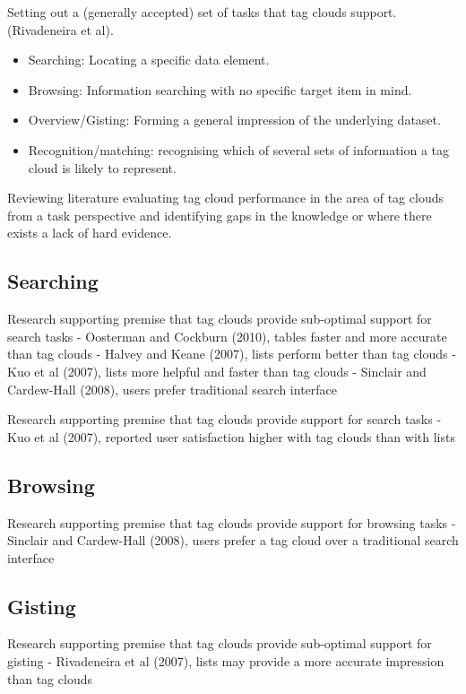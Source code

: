 
Setting out a (generally accepted) set of tasks that tag clouds support. (Rivadeneira et al).

\begin{itemize}
	\item Searching: Locating a specific data element.
	\item Browsing: Information searching with no specific target item in mind.
	\item Overview/Gisting: Forming a general impression of the underlying dataset.
	\item Recognition/matching: recognising which of several sets of information a tag cloud is likely to represent.
\end{itemize}

Reviewing literature evaluating tag cloud performance in the area of tag clouds from a task perspective and identifying gaps in the knowledge or where there exists a lack of hard evidence.

\subsection{Searching}

Research supporting premise that tag clouds provide sub-optimal support for search tasks
- Oosterman and Cockburn (2010), tables faster and more accurate than tag clouds
- Halvey and Keane (2007), lists perform better than tag clouds
- Kuo et al (2007), lists more helpful and faster than tag clouds
- Sinclair and Cardew-Hall (2008), users prefer traditional search interface

Research supporting premise that tag clouds provide support for search tasks
- Kuo et al (2007), reported user satisfaction higher with tag clouds than with lists

\subsection{Browsing}

Research supporting premise that tag clouds provide support for browsing tasks
- Sinclair and Cardew-Hall (2008), users prefer a tag cloud over a traditional search interface

\subsection{Gisting}

Research supporting premise that tag clouds provide sub-optimal support for gisting
-  Rivadeneira et al (2007), lists may provide a more accurate impression than tag clouds

